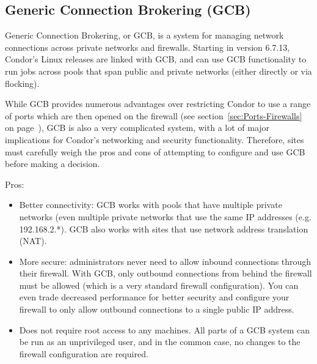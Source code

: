 \subsection{\label{sec:GCB}Generic Connection Brokering (GCB)}

Generic Connection Brokering, or GCB, is a system for managing network
connections across private networks and firewalls.
Starting in version 6.7.13, Condor's Linux releases are linked with
GCB, and can use GCB functionality to run jobs across pools that span
public and private networks (either directly or via flocking).

While GCB provides numerous advantages over restricting Condor to use
a range of ports which are then opened on the firewall (see
section~\ref{sec:Ports-Firewalls} on
page~\pageref{sec:Ports-Firewalls}),
GCB is also a very complicated system, with a lot of major
implications for Condor's networking and security functionality.
Therefore, sites must carefully weigh the pros and cons of attempting
to configure and use GCB before making a decision.

Pros:
\begin{itemize}

\item Better connectivity: GCB works with pools that have multiple
  private networks (even multiple private networks that use the same
  IP addresses (e.g. 192.168.2.*).
  GCB also works with sites that use network address translation
  (NAT). 

\item More secure: administrators never need to allow inbound
  connections through their firewall.
  With GCB, only outbound connections from behind the firewall must be
  allowed (which is a very standard firewall configuration).
  You can even trade decreased performance for better security and
  configure your firewall to only allow outbound connections to a
  single public IP address.

\item Does not require root access to any machines.
  All parts of a GCB system can be run as an unprivileged user, and in
  the common case, no changes to the firewall configuration are
  required.

\end{itemize}

